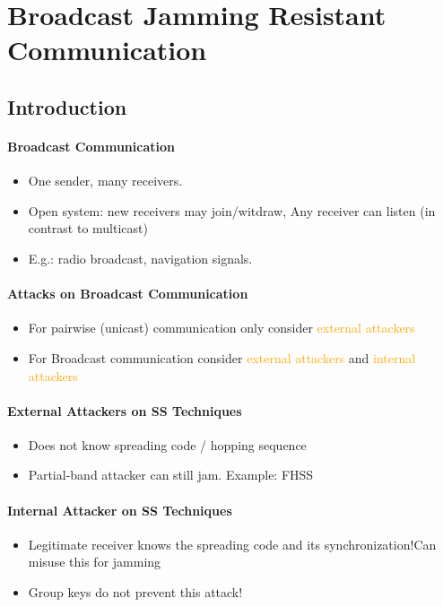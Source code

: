 \section{Broadcast Jamming Resistant Communication}
\subsection{Introduction}

\paragraph{Broadcast Communication}
\begin{itemize}
    \item One sender, many receivers. 
    \item Open system: new receivers may join/witdraw, Any receiver can listen (in contrast to multicast)
    \item E.g.: radio broadcast, navigation signals.
\end{itemize}

\paragraph{Attacks on Broadcast Communication}
\begin{itemize}
    \item For pairwise (unicast) communication only consider \textcolor{orange}{external attackers}
    \item For Broadcast communication consider \textcolor{orange}{external attackers} and \textcolor{orange}{internal attackers}
\end{itemize}

\paragraph{External Attackers on SS Techniques}
\begin{itemize}
    \item Does not know spreading code / hopping sequence
    \item Partial-band attacker can still jam. Example: FHSS
\end{itemize}

\paragraph{Internal Attacker on SS Techniques}
\begin{itemize}
    \item Legitimate receiver knows the spreading code and its synchronization!Can misuse this for jamming
    \item Group keys do not prevent this attack!
\end{itemize}

